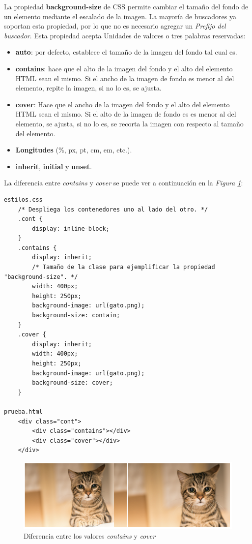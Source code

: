 La propiedad \textbf{background-size} de CSS permite cambiar el tamaño del fondo de un elemento mediante el escalado de la imagen. La mayoría de buscadores ya soportan esta propiedad, por lo que no es necesario agregar un \textit{Prefijo del buscador}. Esta propiedad acepta Unidades de valores o tres palabras reservadas:
\begin{itemize}
    \item \textbf{auto}: por defecto, establece el tamaño de la imagen del fondo tal cual es.
    \item \textbf{contains}: hace que el alto de la imagen del fondo y el alto del elemento HTML sean el mismo. Si el ancho de la imagen de fondo es menor al del elemento, repite la imagen, si no lo es, se ajusta.
    \item \textbf{cover}:  Hace que el ancho de la imagen del fondo y el alto del elemento HTML sean el mismo. Si el alto de la imagen de fondo es es menor al del elemento, se ajusta, si no lo es, se recorta la imagen con respecto al tamaño del elemento.
    \item \textbf{Longitudes} (\%, px, pt, cm, em, etc.).
    \item \textbf{inherit}, \textbf{initial} y \textbf{unset}.
\end{itemize}

La diferencia entre \textit{contains} y \textit{cover} se puede ver a continuación en la \textit{Figura \ref{fig: 47}}:
\begin{lstlisting}
estilos.css
    /* Despliega los contenedores uno al lado del otro. */
    .cont {
        display: inline-block;
    }
    .contains {
        display: inherit;
        /* Tamaño de la clase para ejemplificar la propiedad "background-size". */
        width: 400px;
        height: 250px;
        background-image: url(gato.png);
        background-size: contain;
    }
    .cover {
        display: inherit;
        width: 400px;
        height: 250px;
        background-image: url(gato.png);
        background-size: cover;
    }

prueba.html
    <div class="cont">
        <div class="contains"></div>
        <div class="cover"></div>
    </div>
\end{lstlisting}
\begin{figure}[H]
    \centering
    \caption{Diferencia entre los valores \textit{contains} y \textit{cover}}
    \label{fig: 47}
    \includegraphics[width=12cm]{ss/background-size.png}
\end{figure}

